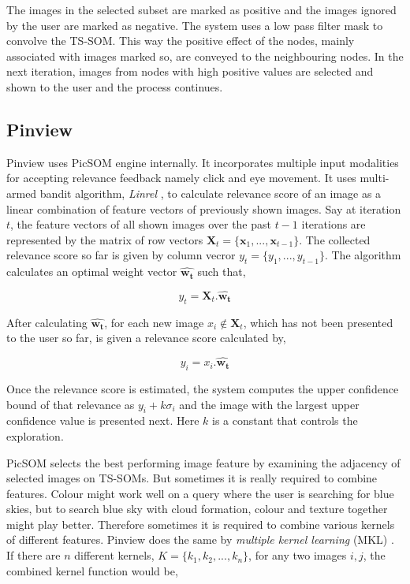 \documentclass[english]{tktltiki}
\begin{document}
The images in the selected subset are marked as positive and the images ignored by the user are marked as negative. The system uses a low pass filter mask to convolve the TS-SOM. This way the positive effect of the nodes, mainly associated with images marked so, are conveyed to the neighbouring nodes. In the next iteration, images from nodes with high positive values are selected and shown to the user and the process continues.

\subsection{Pinview}

Pinview uses PicSOM engine internally. It incorporates multiple input modalities for accepting relevance feedback namely click and eye movement. It uses multi-armed bandit algorithm, \textit{Linrel} \cite{linrel}, to calculate relevance score of an image as a linear combination of feature vectors of previously shown images. Say at iteration $t$, the feature vectors of all shown images over the past $t-1$ iterations are represented by the matrix of row vectors $\mathbf{X}_t = \{\mathbf{x}_1, ..., \mathbf{x}_{t-1}\}$. The collected relevance score so far is given by column vecror $y_t = \{y_1, ..., y_{t-1}\}$. The algorithm calculates an optimal weight vector $\hat{\mathbf{w_t}}$ such that,

$$
y_t = \mathbf{X}_t . \hat{\mathbf{w_t}}
$$

After calculating $\hat{\mathbf{w_t}}$, for each new image $x_i \notin \mathbf{X}_t$, which has not been presented to the user so far, is given a relevance score calculated by,

$$
y_i = x_i . \hat{\mathbf{w_t}}
$$

Once the relevance score is estimated, the system computes the upper confidence bound of that relevance as $y_i + k \sigma_i$ and the image with the largest upper confidence value is presented next. Here $k$ is a constant that controls the exploration.

PicSOM selects the best performing image feature by examining the adjacency of selected images on TS-SOMs. But sometimes it is really required to combine features. Colour might work well on a query where the user is searching for blue skies, but to search blue sky with cloud formation, colour and texture together might play better. Therefore sometimes it is required to combine various kernels of different features. Pinview does the same by \textit{multiple kernel learning} (MKL) \cite{mkl}. If there are $n$ different kernels, $K = \{k_1, k_2, ..., k_n\}$, for any two images $i, j$, the combined kernel function \cite{Pinview} would be,
\end{document}
